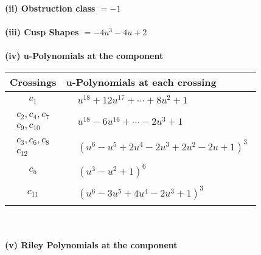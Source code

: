 \documentclass[1p]{elsarticle_modified}
\theoremstyle{definition}
\begin{document}
\flushleft \textbf{(ii) Obstruction class $= -1$}\\~\\
\flushleft \textbf{(iii) Cusp Shapes $= -4 u^3-4 u+2$}\\~\\
\newpage\renewcommand{\arraystretch}{1}
\flushleft \textbf{(iv) u-Polynomials at the component}\newline \\
\begin{tabular}{m{50pt}|m{274pt}}
Crossings & \hspace{64pt}u-Polynomials at each crossing \\
\hline $$\begin{aligned}c_{1}\end{aligned}$$&$\begin{aligned}
&u^{18}+12 u^{17}+\cdots+8 u^2+1
\end{aligned}$\\
\hline $$\begin{aligned}c_{2},c_{4},c_{7}\\c_{9},c_{10}\end{aligned}$$&$\begin{aligned}
&u^{18}-6 u^{16}+\cdots-2 u^3+1
\end{aligned}$\\
\hline $$\begin{aligned}c_{3},c_{6},c_{8}\\c_{12}\end{aligned}$$&$\begin{aligned}
&(u^6- u^5+2 u^4-2 u^3+2 u^2-2 u+1)^3
\end{aligned}$\\
\hline $$\begin{aligned}c_{5}\end{aligned}$$&$\begin{aligned}
&(u^3- u^2+1)^6
\end{aligned}$\\
\hline $$\begin{aligned}c_{11}\end{aligned}$$&$\begin{aligned}
&(u^6-3 u^5+4 u^4-2 u^3+1)^3
\end{aligned}$\\
\hline
\end{tabular}\\~\\
\newpage\renewcommand{\arraystretch}{1}
\flushleft \textbf{(v) Riley Polynomials at the component}\newline \\
\end{document}
